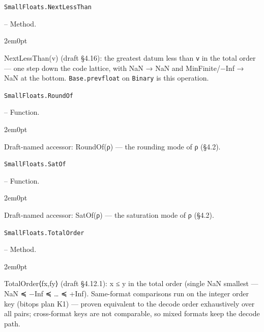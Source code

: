 \par\medskip\noindent\begin{minipage}{\linewidth}
\hypertarget{5658488599993001773}{\texttt{SmallFloats.NextLessThan}}  -- {Method.}
\nopagebreak
\begin{adjustwidth}{2em}{0pt}

NextLessThan(v) (draft §4.16): the greatest datum less than \texttt{v} in the total order — one step down the code lattice, with NaN → NaN and MinFinite/−Inf → NaN at the bottom. \texttt{Base.prevfloat} on \texttt{Binary} is this operation.



\end{adjustwidth}
\end{minipage}
\par\medskip

\par\medskip\noindent\begin{minipage}{\linewidth}
\hypertarget{3159928313134809876}{\texttt{SmallFloats.RoundOf}}  -- {Function.}
\nopagebreak
\begin{adjustwidth}{2em}{0pt}

Draft-named accessor: RoundOf(ρ) — the rounding mode of ρ (§4.2).



\end{adjustwidth}
\end{minipage}
\par\medskip

\par\medskip\noindent\begin{minipage}{\linewidth}
\hypertarget{16516058050886536028}{\texttt{SmallFloats.SatOf}}  -- {Function.}
\nopagebreak
\begin{adjustwidth}{2em}{0pt}

Draft-named accessor: SatOf(ρ) — the saturation mode of ρ (§4.2).



\end{adjustwidth}
\end{minipage}
\par\medskip

\par\medskip\noindent\begin{minipage}{\linewidth}
\hypertarget{8603138667834636985}{\texttt{SmallFloats.TotalOrder}}  -- {Method.}
\nopagebreak
\begin{adjustwidth}{2em}{0pt}

TotalOrder⟨fx,fy⟩ (draft §4.12.1): x ≤ y in the total order (single NaN smallest — NaN ≼ −Inf ≼ … ≼ +Inf). Same-format comparisons run on the integer order key (bitops plan K1) — proven equivalent to the decode order exhaustively over all pairs; cross-format keys are not comparable, so mixed formats keep the decode path.



\end{adjustwidth}
\end{minipage}
\par\medskip

